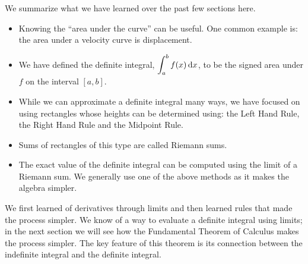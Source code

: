 We summarize what we have learned over the past few sections here.
\begin{itemize}
\item	Knowing the ``area under the curve'' can be useful. One common example is: the area under a velocity curve is displacement.
\item	We have defined the definite integral, $\displaystyle\int_a^b f(x)\operatorname{d}\! x$, to be the signed area under $f$ on the interval $[a,b]$. 
\item	While we can approximate a definite integral many ways, we have focused on using rectangles whose heights can be determined using: the Left Hand Rule, the Right Hand Rule and the Midpoint Rule. 
\item	Sums of rectangles of this type are called Riemann sums.
\item	The exact value of the definite integral can be computed using the limit of a Riemann sum. We generally use one of the above methods as it makes the algebra simpler.
\end{itemize}

We first learned of derivatives through limits and then learned rules that made the process simpler. We know of a way to evaluate a definite integral using limits; in the next section we will see how the Fundamental Theorem of Calculus makes the process simpler. The key feature of this theorem is its connection between the indefinite integral and the definite integral.

